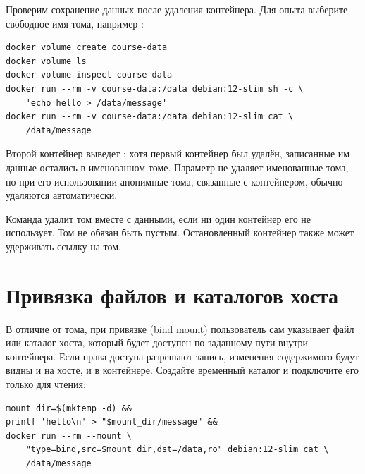 \par\addvspace{10pt}\noindent\begin{minipage}{\linewidth}
\setlength{\parindent}{0pt}\noindent\hspace*{1.25cm}Проверим сохранение данных после удаления контейнера. Для опыта выберите свободное имя тома, например :\par\kern 10pt
\begin{verbatim}
docker volume create course-data
docker volume ls
docker volume inspect course-data
docker run --rm -v course-data:/data debian:12-slim sh -c \
    'echo hello > /data/message'
docker run --rm -v course-data:/data debian:12-slim cat \
    /data/message
\end{verbatim}
\end{minipage}\par\addvspace{10pt}

Второй контейнер выведет : хотя первый контейнер был удалён, записанные им данные остались в именованном томе. Параметр  не удаляет именованные тома, но при его использовании анонимные тома, связанные с контейнером, обычно удаляются автоматически.

{\setlength{\linewidth}{\dimexpr\linewidth-2\fboxsep-2\fboxrule\relax}
\begin{warnbox}
Команда \cmd{docker volume rm course-data} удалит том вместе с данными, если ни один контейнер его не использует. Том не обязан быть пустым. Остановленный контейнер также может удерживать ссылку на том.
\end{warnbox}
}

\section{Привязка файлов и каталогов хоста}

В отличие от тома, при привязке (bind mount) пользователь сам указывает файл или каталог хоста, который будет доступен по заданному пути внутри контейнера. Если права доступа разрешают запись, изменения содержимого будут видны и на хосте, и в контейнере. Создайте временный каталог и подключите его только для чтения:
\par\addvspace{10pt}\noindent\begin{minipage}{\linewidth}
\begin{verbatim}
mount_dir=$(mktemp -d) &&
printf 'hello\n' > "$mount_dir/message" &&
docker run --rm --mount \
    "type=bind,src=$mount_dir,dst=/data,ro" debian:12-slim cat \
    /data/message
\end{verbatim}
\end{minipage}\par\addvspace{10pt}

